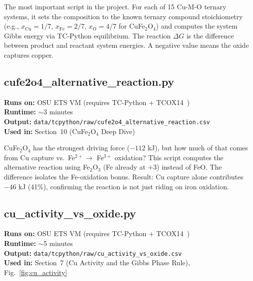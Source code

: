 \documentclass[11pt]{article}
\begin{document}
The most important script in the project. For each of 15 Cu-M-O ternary systems, it sets the composition to the known ternary compound stoichiometry (e.g., $x_{\text{Cu}}=1/7$, $x_{\text{Fe}}=2/7$, $x_{\text{O}}=4/7$ for CuFe$_2$O$_4$) and computes the system Gibbs energy via TC-Python equilibrium. The reaction $\Delta G$ is the difference between product and reactant system energies. A negative value means the oxide captures copper.



\cleardoublepage
\subsection{cufe2o4\_alternative\_reaction.py}
\label{script:cufe2o4_alt}

\textbf{Runs on:} OSU ETS VM (requires TC-Python + TCOX14~\cite{TCOX14})\\
\textbf{Runtime:} $\sim$3 minutes\\
\textbf{Output:} \texttt{data/tcpython/raw/cufe2o4\_alternative\_reaction.csv}\\
\textbf{Used in:} Section~10 (CuFe$_2$O$_4$ Deep Dive)

CuFe$_2$O$_4$ has the strongest driving force ($-112$ kJ), but how much of that comes from Cu capture vs.\ Fe$^{2+} \to$ Fe$^{3+}$ oxidation? This script computes the alternative reaction using Fe$_2$O$_3$ (Fe already at $+3$) instead of FeO. The difference isolates the Fe-oxidation bonus. Result: Cu capture alone contributes $-46$ kJ (41\%), confirming the reaction is not just riding on iron oxidation.



\cleardoublepage
\subsection{cu\_activity\_vs\_oxide.py}
\label{script:cu_activity}

\textbf{Runs on:} OSU ETS VM (requires TC-Python + TCOX14~\cite{TCOX14})\\
\textbf{Runtime:} $\sim$5 minutes\\
\textbf{Output:} \texttt{data/tcpython/raw/cu\_activity\_vs\_oxide.csv}\\
\textbf{Used in:} Section~7 (Cu Activity and the Gibbs Phase Rule), Fig.~\ref{fig:cu_activity}
\end{document}
